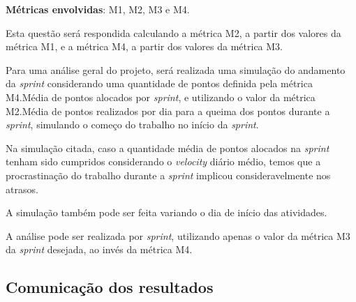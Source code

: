       		\textbf{Métricas envolvidas}: M1, M2, M3 e M4.

      		Esta questão será respondida calculando a métrica M2, a partir dos valores da métrica M1, e a métrica M4, a partir dos valores
      		da métrica M3.

      		Para uma análise geral do projeto, será realizada uma simulação do andamento da \textit{sprint} considerando uma quantidade de
      		pontos definida pela métrica M4.Média de pontos alocados por \textit{sprint}, e utilizando o valor da métrica M2.Média de pontos realizados por dia para a queima dos pontos durante a \textit{sprint}, simulando o começo do trabalho no início da \textit{sprint}.

      		Na simulação citada, caso a quantidade média de pontos alocados na \textit{sprint} tenham sido cumpridos considerando 
      		o \textit{velocity} diário médio, temos que a procrastinação do trabalho durante a \textit{sprint} implicou
      		consideravelmente nos atrasos.

      		A simulação também pode ser feita variando o dia de início das atividades.

      		A análise pode ser realizada por \textit{sprint}, utilizando apenas o valor da métrica M3 da \textit{sprint} desejada, ao invés da métrica M4. 
      
      \subsection{Comunicação dos resultados}